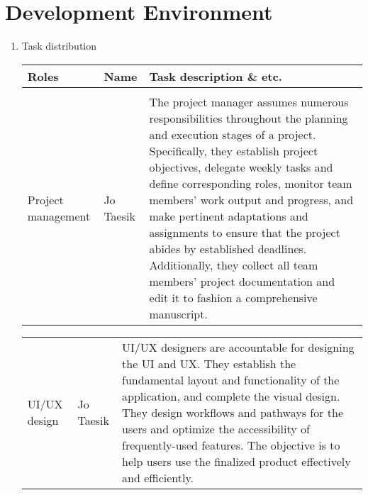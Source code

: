 \section{\Large{Development Environment}}
\begin{enumerate}[label=\arabic*]
    \item {\large{Task distribution}}
          \begin{table}[H]
              \center
              \begin{tabular}{m{1.4cm} m{1.5cm} m{4cm}}
                  \toprule
                  Roles              & Name      & Task description \& etc.                                                                                                                                                                                                                                                                                                                                                                                                                                                                                 \\
                  \midrule
                  \\
                  Project management & Jo Taesik & The project manager assumes numerous responsibilities throughout the planning and execution stages of a project. Specifically, they establish project objectives, delegate weekly tasks and define corresponding roles, monitor team members' work output and progress, and make pertinent adaptations and assignments to ensure that the project abides by established deadlines. Additionally, they collect all team members' project documentation and edit it to fashion a comprehensive manuscript. \\
              \end{tabular}
          \end{table}

          \begin{table}[H]
              \center
              \begin{tabular}{m{1.4cm} m{1.5cm} m{4cm}}
                  UI/UX design & Jo Taesik & UI/UX designers are accountable for designing the UI and UX. They establish the fundamental layout and functionality of the application, and complete the visual design. They design workflows and pathways for the users and optimize the accessibility of frequently-used features. The objective is to help users use the finalized product effectively and efficiently. \\
              \end{tabular}
          \end{table}


\end{enumerate}

